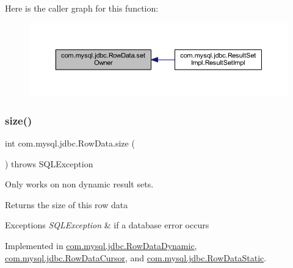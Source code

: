Here is the caller graph for this function\+:
\nopagebreak
\begin{figure}[H]
\begin{center}
\leavevmode
\includegraphics[width=350pt]{interfacecom_1_1mysql_1_1jdbc_1_1_row_data_ad2c7f5220e0bd60681453d3d294607cc_icgraph}
\end{center}
\end{figure}
\mbox{\label{interfacecom_1_1mysql_1_1jdbc_1_1_row_data_a7c6f91ddc0fcd7f5f12a64c7dc019995}} 
\subsubsection{\texorpdfstring{size()}{size()}}
{\footnotesize\ttfamily int com.\+mysql.\+jdbc.\+Row\+Data.\+size (\begin{DoxyParamCaption}{ }\end{DoxyParamCaption}) throws S\+Q\+L\+Exception}

Only works on non dynamic result sets.

\begin{DoxyReturn}{Returns}
the size of this row data 
\end{DoxyReturn}

\begin{DoxyExceptions}{Exceptions}
{\em S\+Q\+L\+Exception} & if a database error occurs \\
\hline
\end{DoxyExceptions}


Implemented in \mbox{\hyperlink{classcom_1_1mysql_1_1jdbc_1_1_row_data_dynamic_a2cd7d4bfa00589c4356506d55c88a8e0}{com.\+mysql.\+jdbc.\+Row\+Data\+Dynamic}}, \mbox{\hyperlink{classcom_1_1mysql_1_1jdbc_1_1_row_data_cursor_ad597fd5a0264701684a13303c49b13b6}{com.\+mysql.\+jdbc.\+Row\+Data\+Cursor}}, and \mbox{\hyperlink{classcom_1_1mysql_1_1jdbc_1_1_row_data_static_a68dbbf37a23e7933db5e775de1ec27f5}{com.\+mysql.\+jdbc.\+Row\+Data\+Static}}.

